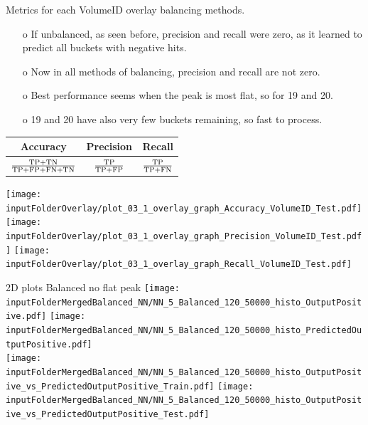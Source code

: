 \documentclass{beamer}
\begin{document}
\begin{frame}{Metrics for each VolumeID overlay balancing methods.}
\begin{enumerate}
\item[o] If unbalanced, as seen before, precision and recall were zero, as it learned to predict all buckets with negative hits.
\item[o] Now in all methods of balancing, precision and recall are not zero.
\item[o] Best performance seems when the peak is most flat, so for 19 and 20. 
\item[o] 19 and 20 have also very few buckets remaining, so fast to process.
\end{enumerate}
\centering
\begin{center}
\begin{tabular}{ |c|c|c| } 
\hline
Accuracy & Precision & Recall \\ 
\hline
$\frac{\TP+\TN}{\TP+\FP+\FN+\TN}$ & $\frac{\TP}{\TP+\FP}$  & $\frac{\TP}{\TP+\FN}$ \\ 
\hline
\end{tabular}
\end{center}
\texttt{[image: \\inputFolderOverlay/plot\_03\_1\_overlay\_graph\_Accuracy\_VolumeID\_Test.pdf]}
\texttt{[image: \\inputFolderOverlay/plot\_03\_1\_overlay\_graph\_Precision\_VolumeID\_Test.pdf]}
\texttt{[image: \\inputFolderOverlay/plot\_03\_1\_overlay\_graph\_Recall\_VolumeID\_Test.pdf]}\\
\end{frame}

\begin{frame}{2D plots Balanced no flat peak}
\texttt{[image: \\inputFolderMergedBalanced\_NN/NN\_5\_Balanced\_120\_50000\_histo\_OutputPositive.pdf]}
\texttt{[image: \\inputFolderMergedBalanced\_NN/NN\_5\_Balanced\_120\_50000\_histo\_PredictedOutputPositive.pdf]}\\
\texttt{[image: \\inputFolderMergedBalanced\_NN/NN\_5\_Balanced\_120\_50000\_histo\_OutputPositive\_vs\_PredictedOutputPositive\_Train.pdf]}
\texttt{[image: \\inputFolderMergedBalanced\_NN/NN\_5\_Balanced\_120\_50000\_histo\_OutputPositive\_vs\_PredictedOutputPositive\_Test.pdf]}
\end{frame}
\clearpage
\end{document}

